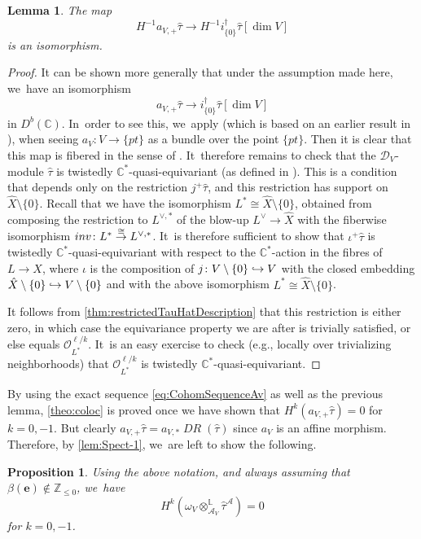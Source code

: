 \documentclass[11pt]{article}
\let\mathds\mathbb
\newcommand\hto{\mathrel{\lhook\joinrel\to}}
\newcommand{\bme}{{\boldsymbol{e}}}
\newtheorem{prop}[thm]{Proposition}
\newtheorem{lem}[thm]{Lemma}
\newcommand{\dC}{{\mathds C}}\let\C\dC
\newcommand{\dZ}{{\mathds Z}}\let\mbz\dZ\let\Z\dZ
\newcommand{\dL}{{\mathbb L}}
\newcommand{\cA}{\mathscr{A}}
\newcommand{\cD}{\mathscr{D}}
\newcommand{\cO}{\mathcal{O}}\let\O\cO
\DeclareMathOperator{\DR}{\mathit{DR}}
\begin{document}
\begin{lem}
The map
\[
H^{-1} a_{V,+} \hat\tau
\to H^{-1} i_{\{0\}}^\dag \hat\tau[\dim V]
\]
is an isomorphism.
\end{lem}

\begin{proof}
It can be shown more generally that under the assumption made here, we~have an isomorphism
\[
a_{V,+} \hat\tau
\to i_{\{0\}}^\dag \hat\tau[\dim V]
\]
in $D^b(\dC)$. In~order to see this, we~apply \cite[Lem.\,4.4]{AviDualProjRestrGKZ} (which is based on an earlier result in \cite[Lem.\,3.3]{ReichWalth-Duco}),
when seeing $a_V \colon V\to\{pt\}$ as a bundle over the point $\{pt\}$. Then it is clear that this map is fibered in the sense of \cite[Def.\,4.1]{AviDualProjRestrGKZ}. It~therefore remains to check that the $\cD_V$\nobreakdash-mod\-ule $\hat\tau$ is twistedly $\dC^*$-quasi-equivariant (as defined in \cite[Def.\,4.2]{AviDualProjRestrGKZ}). This is a condition that depends only on the restriction
$j^+\hat\tau$, and this restriction has support on $\hat{X}\setminus \{0\}$.
Recall that we have the isomorphism $L^* \cong \hat{X}\setminus\{0\}$, obtained from composing the restriction to $L^{\vee,*}$ of the blow-up $L^\vee \to \hat{X}$ with the fiberwise isomorphism $\textup{inv} \colon L^*\stackrel{\cong}{\to} L^{\vee,*}$. It~is therefore sufficient
to show that $\iota^+\hat{\tau}$ is
twistedly $\dC^*$-quasi-equivariant with respect to the
$\dC^*$-action in the fibres of $L\to X$, where $\iota$ is the composition of $j \colon V\setminus \{0\}\hto V$ with the closed embedding $\hat{X}\setminus\{0\}\hto V\setminus\{0\}$ and with the above isomorphism $L^{*}\cong \hat{X}\setminus\{0\}$.

It follows from \cref{thm:restrictedTauHatDescription} that this restriction is either zero, in which case the equivariance property we are after is trivially satisfied, or else equals $\cO_{L^*}^{\ell/k}$. It~is an easy exercise to check (e.g., locally over trivializing neighborhoods) that $\cO_{L^*}^{\ell/k}$ is
twistedly $\dC^*$-quasi-equivariant.
\end{proof}

By using the exact sequence \eqref{eq:CohomSequenceAv} as well as the previous lemma, \cref{theo:coloc} is proved once we have shown that $H^k(a_{V,+}\hat\tau)=0$ for $k=0,-1$. But clearly $a_{V,+}\hat\tau = a_{V,*}\DR(\hat\tau)$ since $a_V$ is an affine morphism. Therefore, by \cref{lem:Spect-1}, we~are left to show the following.

\begin{prop}\label{prop:VanishCohomA}
Using the above notation, and always assuming that
$\beta(\bme)\notin \dZ_{\leq 0}$, we~have
\[
H^k(\omega_V\otimes^\dL_{\cA_V}\hat{\tau}^\cA)=0
\]
for $k=0,-1$.
\end{prop}
\end{document}
